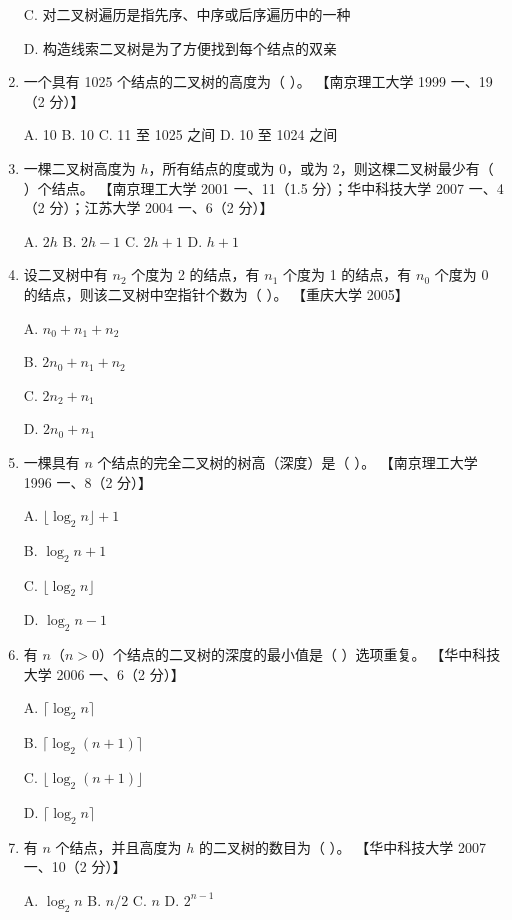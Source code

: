 \documentclass[lang=cn,newtx,10pt,scheme=chinese]{elegantbook}
\begin{document}
\begin{enumerate}
    C. 对二叉树遍历是指先序、中序或后序遍历中的一种  

    D. 构造线索二叉树是为了方便找到每个结点的双亲  

    \item 一个具有 1025 个结点的二叉树的高度为（ ）。  
    【南京理工大学 1999 一、19（2 分）】  

    A. 10 \quad B. 10 \quad C. 11 至 1025 之间 \quad D. 10 至 1024 之间  

    \item 一棵二叉树高度为 $h$，所有结点的度或为 0，或为 2，则这棵二叉树最少有（ ）个结点。  
    【南京理工大学 2001 一、11（1.5 分）；华中科技大学 2007 一、4（2 分）；江苏大学 2004 一、6（2 分）】  

    A. $2h$ \quad B. $2h - 1$ \quad C. ${2h+1}$ \quad D. $h + 1$  

    \item 设二叉树中有 $n_2$ 个度为 2 的结点，有 $n_1$ 个度为 1 的结点，有 $n_0$ 个度为 0 的结点，则该二叉树中空指针个数为（ ）。  
    【重庆大学 2005】  

    A. $n_0 + n_1 + n_2$  

    B. $2n_0 + n_1 + n_2$  

    C. $2n_2 + n_1$  

    D. $2n_0 + n_1 $  

    \item 一棵具有 $n$ 个结点的完全二叉树的树高（深度）是（ ）。  
    【南京理工大学 1996 一、8（2 分）】  

    A. $\lfloor \log_2 n \rfloor + 1$  

    B. $ \log_2 n  + 1$ 

    C. $ \lfloor \log_2 n \rfloor$  

    D. $\log_2 n - 1$  

    \item 有 $n$（$n > 0$）个结点的二叉树的深度的最小值是（ ）选项重复。  
    【华中科技大学 2006 一、6（2 分）】  

    A. $\lceil \log_2 n \rceil$  
    
    B. $\lceil \log_2 (n + 1) \rceil$  

    C. $\lfloor \log_2 (n + 1) \rfloor$  

    D. $\lceil \log_2 n \rceil$  

    \item 有 $n$ 个结点，并且高度为 $h$ 的二叉树的数目为（ ）。  
    【华中科技大学 2007 一、10（2 分）】 

    A. $\log_2 n$ \quad B. $n / 2$ \quad C. $n$ \quad D. $2^{n-1}$  


\end{enumerate}
\end{document}
